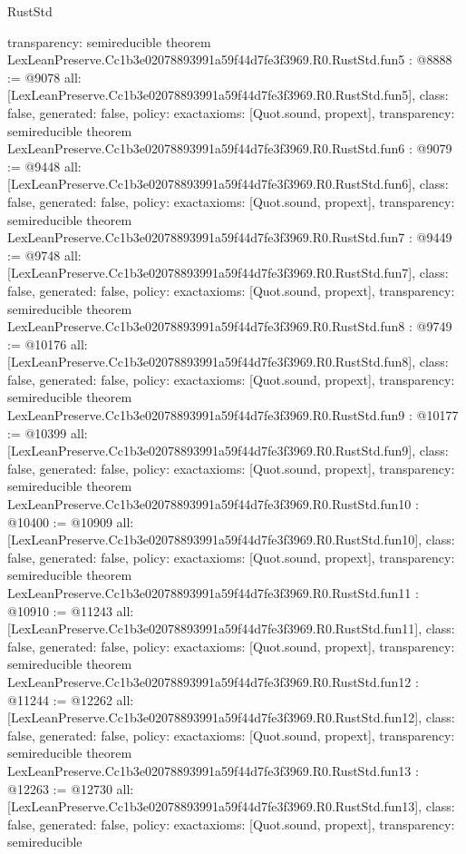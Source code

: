 \begin{lexlean}{RustStd}
\begin{coremodule}
{  transparency: semireducible
}
theorem LexLeanPreserve.Cc1b3e02078893991a59f44d7fe3f3969.R0.RustStd.fun5 : @8888 := @9078 {
  all: [LexLeanPreserve.Cc1b3e02078893991a59f44d7fe3f3969.R0.RustStd.fun5],
  class: false,
  generated: false,
  policy: exact{axioms: [Quot.sound, propext]},
  transparency: semireducible
}
theorem LexLeanPreserve.Cc1b3e02078893991a59f44d7fe3f3969.R0.RustStd.fun6 : @9079 := @9448 {
  all: [LexLeanPreserve.Cc1b3e02078893991a59f44d7fe3f3969.R0.RustStd.fun6],
  class: false,
  generated: false,
  policy: exact{axioms: [Quot.sound, propext]},
  transparency: semireducible
}
theorem LexLeanPreserve.Cc1b3e02078893991a59f44d7fe3f3969.R0.RustStd.fun7 : @9449 := @9748 {
  all: [LexLeanPreserve.Cc1b3e02078893991a59f44d7fe3f3969.R0.RustStd.fun7],
  class: false,
  generated: false,
  policy: exact{axioms: [Quot.sound, propext]},
  transparency: semireducible
}
theorem LexLeanPreserve.Cc1b3e02078893991a59f44d7fe3f3969.R0.RustStd.fun8 : @9749 := @10176 {
  all: [LexLeanPreserve.Cc1b3e02078893991a59f44d7fe3f3969.R0.RustStd.fun8],
  class: false,
  generated: false,
  policy: exact{axioms: [Quot.sound, propext]},
  transparency: semireducible
}
theorem LexLeanPreserve.Cc1b3e02078893991a59f44d7fe3f3969.R0.RustStd.fun9 : @10177 := @10399 {
  all: [LexLeanPreserve.Cc1b3e02078893991a59f44d7fe3f3969.R0.RustStd.fun9],
  class: false,
  generated: false,
  policy: exact{axioms: [Quot.sound, propext]},
  transparency: semireducible
}
theorem LexLeanPreserve.Cc1b3e02078893991a59f44d7fe3f3969.R0.RustStd.fun10 : @10400 := @10909 {
  all: [LexLeanPreserve.Cc1b3e02078893991a59f44d7fe3f3969.R0.RustStd.fun10],
  class: false,
  generated: false,
  policy: exact{axioms: [Quot.sound, propext]},
  transparency: semireducible
}
theorem LexLeanPreserve.Cc1b3e02078893991a59f44d7fe3f3969.R0.RustStd.fun11 : @10910 := @11243 {
  all: [LexLeanPreserve.Cc1b3e02078893991a59f44d7fe3f3969.R0.RustStd.fun11],
  class: false,
  generated: false,
  policy: exact{axioms: [Quot.sound, propext]},
  transparency: semireducible
}
theorem LexLeanPreserve.Cc1b3e02078893991a59f44d7fe3f3969.R0.RustStd.fun12 : @11244 := @12262 {
  all: [LexLeanPreserve.Cc1b3e02078893991a59f44d7fe3f3969.R0.RustStd.fun12],
  class: false,
  generated: false,
  policy: exact{axioms: [Quot.sound, propext]},
  transparency: semireducible
}
theorem LexLeanPreserve.Cc1b3e02078893991a59f44d7fe3f3969.R0.RustStd.fun13 : @12263 := @12730 {
  all: [LexLeanPreserve.Cc1b3e02078893991a59f44d7fe3f3969.R0.RustStd.fun13],
  class: false,
  generated: false,
  policy: exact{axioms: [Quot.sound, propext]},
  transparency: semireducible
}
\end{coremodule}
\end{lexlean}
